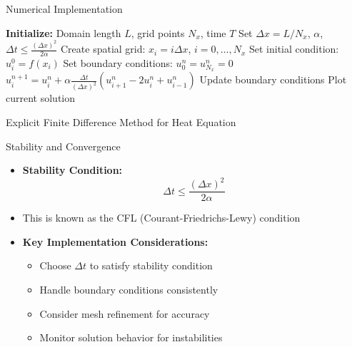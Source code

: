 \documentclass[10pt]{beamer}
\theoremstyle{plain}%
\theoremstyle{definition}
\theoremstyle{remark}
\begin{document}
\begin{frame}{Numerical Implementation}
    \begin{algorithm}[H]
        \begin{algorithmic}[1]
            \State \textbf{Initialize:} Domain length $L$, grid points $N_x$, time $T$
            \State Set $\Delta x = L/N_x$, $\alpha$, $\Delta t \leq \frac{(\Delta x)^2}{2\alpha}$
            \State Create spatial grid: $x_i = i\Delta x$, $i = 0,\ldots,N_x$
            \State Set initial condition: $u_i^0 = f(x_i)$
            \State Set boundary conditions: $u_0^n = u_{N_x}^n = 0$
                    \State $u_i^{n+1} = u_i^n + \alpha\frac{\Delta t}{(\Delta x)^2}(u_{i+1}^n - 2u_i^n + u_{i-1}^n)$
                \EndFor
                \State Update boundary conditions
                    \State Plot current solution
                \EndIf
            \EndFor
        \end{algorithmic}
        \caption{Explicit Finite Difference Method for Heat Equation}
    \end{algorithm}
\end{frame}

\begin{frame}{Stability and Convergence}
    \begin{itemize}
        \item \textbf{Stability Condition:}
        \[ \Delta t \leq \frac{(\Delta x)^2}{2\alpha} \]
        \item This is known as the CFL (Courant-Friedrichs-Lewy) condition
        \vspace{0.3cm}
        \item \textbf{Key Implementation Considerations:}
        \begin{itemize}
            \item Choose $\Delta t$ to satisfy stability condition
            \item Handle boundary conditions consistently
            \item Consider mesh refinement for accuracy
            \item Monitor solution behavior for instabilities
        \end{itemize}
    \end{itemize}
\end{frame}
\end{document}
